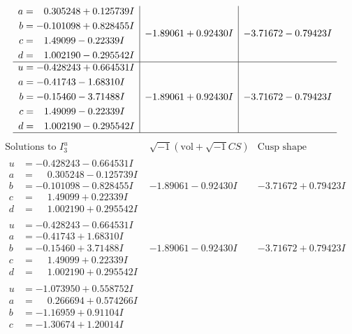 \documentclass[1p]{elsarticle_modified}
\theoremstyle{definition}
\newcommand{\I}{\sqrt{-1}}
\begin{document}
$$\begin{array}{c|c|c}
\begin{aligned}
a &= \phantom{-}0.305248 + 0.125739 I \\
b &= -0.101098 + 0.828455 I \\
c &= \phantom{-}1.49099 - 0.22339 I \\
d &= \phantom{-}1.002190 - 0.295542 I\end{aligned}
 & -1.89061 + 0.92430 I & -3.71672 - 0.79423 I \\ \hline\begin{aligned}
u &= -0.428243 + 0.664531 I \\
a &= -0.41743 - 1.68310 I \\
b &= -0.15460 - 3.71488 I \\
c &= \phantom{-}1.49099 - 0.22339 I \\
d &= \phantom{-}1.002190 - 0.295542 I\end{aligned}
 & -1.89061 + 0.92430 I & -3.71672 - 0.79423 I\\
 \hline 
 \end{array}$$\newpage$$\begin{array}{c|c|c}  
\text{Solutions to }I^u_{3}& \I (\text{vol} + \sqrt{-1}CS) & \text{Cusp shape}\\
 \hline 
\begin{aligned}
u &= -0.428243 - 0.664531 I \\
a &= \phantom{-}0.305248 - 0.125739 I \\
b &= -0.101098 - 0.828455 I \\
c &= \phantom{-}1.49099 + 0.22339 I \\
d &= \phantom{-}1.002190 + 0.295542 I\end{aligned}
 & -1.89061 - 0.92430 I & -3.71672 + 0.79423 I \\ \hline\begin{aligned}
u &= -0.428243 - 0.664531 I \\
a &= -0.41743 + 1.68310 I \\
b &= -0.15460 + 3.71488 I \\
c &= \phantom{-}1.49099 + 0.22339 I \\
d &= \phantom{-}1.002190 + 0.295542 I\end{aligned}
 & -1.89061 - 0.92430 I & -3.71672 + 0.79423 I \\ \hline\begin{aligned}
u &= -1.073950 + 0.558752 I \\
a &= \phantom{-}0.266694 + 0.574266 I \\
b &= -1.16959 + 0.91104 I \\
c &= -1.30674 + 1.20014 I \\

\end{aligned}
\end{array}$$
\end{document}
